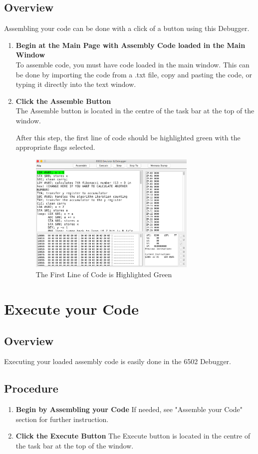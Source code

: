 \documentclass[a3paper, 11pt]{article}
\begin{document}
\subsection{Overview}
Assembling your code can be done with a click of a button using this Debugger. 
\begin{enumerate}
	\item \textbf{Begin at the Main Page with Assembly Code loaded in the Main Window}\\
	To assemble code, you must have code loaded in the main window. This can be done by importing the code from a .txt file, copy and pasting the code, or typing it directly into the text window. 
	\item \textbf{Click the Assemble Button}\\
	The Assemble button is located in the centre of the task bar at the top of the window. 
	\par
	After this step, the first line of code should be highlighted green with the appropriate flags selected. 
	\begin{figure}[h!]
		\centering
		\includegraphics[width=8cm, height=5.74cm]{Assemble}
		\caption{The First Line of Code is Highlighted Green}
	\end{figure} 
\end{enumerate}

\section{Execute your Code}
\subsection{Overview}
Executing your loaded assembly code is easily done in the 6502 Debugger. 
\subsection{Procedure}
\begin{enumerate}
	\item \textbf{Begin by Assembling your Code}
	If needed, see "Assemble your Code" section for further instruction.
	\item \textbf{Click the Execute Button}
	The Execute button is located in the centre of the task bar at the top of the window.	
\end{enumerate}
\end{document}
